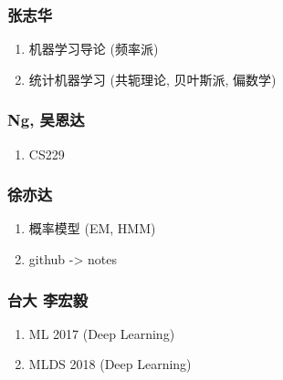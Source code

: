 \documentclass[11pt]{article}
\begin{document}
\subsubsection{张志华}
\label{sec:org85edb7d}
\begin{enumerate}
\item 机器学习导论 (频率派)
\label{sec:org7d2c0b0}
\item 统计机器学习 (共轭理论, 贝叶斯派, 偏数学)
\label{sec:orga5992b0}
\end{enumerate}
\subsubsection{Ng, 吴恩达}
\label{sec:org1c46dd6}
\begin{enumerate}
\item CS229
\label{sec:org409c8cf}
\end{enumerate}
\subsubsection{徐亦达}
\label{sec:org6e6ade7}
\begin{enumerate}
\item 概率模型 (EM, HMM)
\label{sec:org97e26fd}
\item github -> notes
\label{sec:org7c1694e}
\end{enumerate}
\subsubsection{台大 李宏毅}
\label{sec:org6671a39}
\begin{enumerate}
\item ML 2017 (Deep Learning)
\label{sec:orgfdbecac}
\item MLDS 2018 (Deep Learning)
\label{sec:org51aebab}
\end{enumerate}
\end{document}
